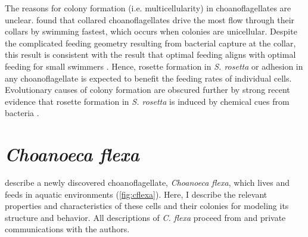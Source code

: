 The reasons for colony formation (i.e. multicellularity) in choanoflagellates are unclear. 
\citet{kirkegaard2016} found that collared choanoflagellates drive the most flow through their collars by swimming fastest, which occurs when colonies are unicellular.
Despite the complicated feeding geometry resulting from bacterial capture at the collar, this result is consistent with the result that optimal feeding aligns with optimal feeding for small swimmers \citep{michelin2011}.
Hence, rosette formation in \textit{S. rosetta} or adhesion in any choanoflagellate is expected to benefit the feeding rates of individual cells. 
Evolutionary causes of colony formation are obscured further by strong recent evidence that rosette formation in \textit{S. rosetta} is induced by chemical cues from bacteria \citep{alegado2012,woznica2016}.

\section{\textit{Choanoeca flexa}}  %

\citet{brunet2019} describe a newly discovered choanoflagellate, \textit{Choanoeca flexa}, which lives and feeds in aquatic environments (\cref{fig:cflexa}). 
Here, I describe the relevant properties and characteristics of these cells and their colonies for modeling its structure and behavior. 
All descriptions of \textit{C. flexa} proceed from \citet{brunet2019} and private communications with the authors.

